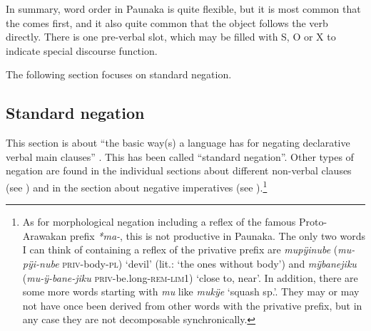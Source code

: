 %
%






In summary, word order in Paunaka is quite flexible, but it is most common that the  comes first, and it also quite common that the object follows the verb directly. There is one pre-verbal slot, which may be filled with S, O or X to indicate special discourse function.


The following section focuses on standard negation.




\subsection{Standard negation}\label{sec:Negation}

This section is about “the basic way(s) a language has for negating declarative verbal main clauses” \citep[1]{Miestamo2005}. This has been called “standard negation”. Other types of negation are found in the individual sections about different non-verbal clauses (see ) and in the section about negative imperatives (see ).\footnote{\label{fn:privative} As for morphological negation including a reflex of the famous Proto-Arawakan  prefix \textit{*ma-}, this is not productive in Paunaka. The only two words I can think of containing a reflex of the privative prefix are \textit{mupÿinube} (\textit{mu-pÿi-nube} \textsc{priv}-body-\textsc{pl}) ‘devil’ (lit.: ‘the ones without body’) and \textit{mÿbanejiku} (\textit{mu-ÿ-bane-jiku} \textsc{priv}-be.long-\textsc{rem}-\textsc{lim}1) ‘close to, near’. In addition, there are some more words starting with \textit{mu} like \textit{mukÿe} ‘squash sp.’. They may or may not have once been derived from other words with the privative prefix, but in any case they are not decomposable synchronically.}

